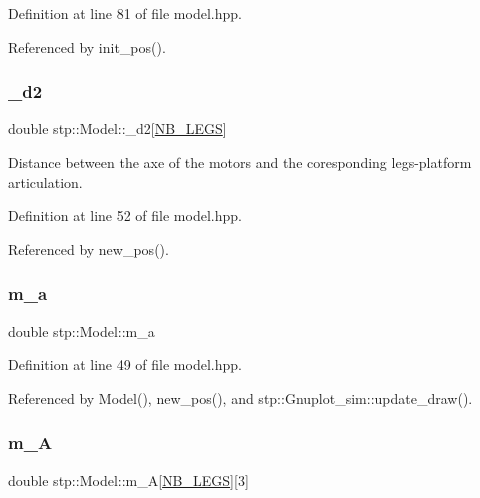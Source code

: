 Definition at line 81 of file model.\+hpp.



Referenced by init\+\_\+pos().

\mbox{\label{classstp_1_1_model_ac031672ca5aae4c192c38b1103fdf2dd}} 
\subsubsection{\texorpdfstring{\+\_\+d2}{\_d2}}
{\footnotesize\ttfamily double stp\+::\+Model\+::\+\_\+d2\mbox{[}\hyperlink{model_8hpp_ae44092ed043cb4350e2df47fdee890b9}{N\+B\+\_\+\+L\+E\+GS}\mbox{]}\hspace{0.3cm}{\ttfamily [protected]}}

Distance between the axe of the motors and the coresponding legs-\/platform articulation. 

Definition at line 52 of file model.\+hpp.



Referenced by new\+\_\+pos().

\mbox{\label{classstp_1_1_model_a446d3fd455f0e44ec6a358b458ba85f2}} 
\subsubsection{\texorpdfstring{m\+\_\+a}{m\_a}}
{\footnotesize\ttfamily double stp\+::\+Model\+::m\+\_\+a\hspace{0.3cm}{\ttfamily [protected]}}



Definition at line 49 of file model.\+hpp.



Referenced by Model(), new\+\_\+pos(), and stp\+::\+Gnuplot\+\_\+sim\+::update\+\_\+draw().

\mbox{\label{classstp_1_1_model_a4aaa7aee9ac9d9903d29d06cf15ed601}} 
\subsubsection{\texorpdfstring{m\+\_\+A}{m\_A}}
{\footnotesize\ttfamily double stp\+::\+Model\+::m\+\_\+A\mbox{[}\hyperlink{model_8hpp_ae44092ed043cb4350e2df47fdee890b9}{N\+B\+\_\+\+L\+E\+GS}\mbox{]}\mbox{[}3\mbox{]}\hspace{0.3cm}{\ttfamily [protected]}}

